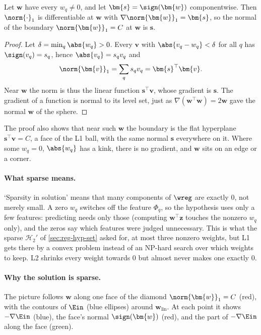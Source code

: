 \begin{lemma}\label{lem:l1-normal}
    Let \(\bm{w}\) have every \(w_q \neq 0\), and let \(\bm{s} =
    \sign(\bm{w})\) componentwise. Then \(\norm{\cdot}_1\) is differentiable
    at \(\bm{w}\) with \(\nabla \norm{\bm{w}}_1 = \bm{s}\), so the normal of the
    boundary \(\norm{\bm{w}}_1 = C\) at \(\bm{w}\) is \(\bm{s}\).
\end{lemma}

\begin{proof}
    Let \(\delta = \min_q \abs{w_q} > 0\). Every \(\bm{v}\) with \(\abs{v_q -
    w_q} < \delta\) for all \(q\) has \(\sign(v_q) = s_q\), hence
    \(\abs{v_q} = s_q v_q\) and
    \[
        \norm{\bm{v}}_1 = \sum_q s_q v_q = \bm{s}^\top \bm{v} .
    \]
    Near \(\bm{w}\) the norm is thus the linear function \(\bm{s}^\top
    \bm{v}\), whose gradient is \(\bm{s}\). The gradient of a function is
    normal to its level set, just as \(\nabla(\bm{w}^\top \bm{w}) = 2\bm{w}\)
    gave the normal \(\bm{w}\) of the sphere.
\end{proof}

The proof also shows that near such \(\bm{w}\) the boundary is the flat
hyperplane \(\bm{s}^\top \bm{v} = C\), a face of the L1 ball, with the same
normal \(\bm{s}\) everywhere on it. Where some \(w_q = 0\), \(\abs{w_q}\) has a
kink, there is no gradient, and \(\bm{w}\) sits on an edge or a corner.

\paragraph{What sparse means.} `Sparsity in solution' means that many
components of \(\wreg\) are exactly \(0\), not merely small. A zero \(w_q\)
switches off the feature \(\Phi_q\), so the hypothesis uses only a few
features: predicting needs only those (computing \(\bm{w}^\top \bm{z}\) touches
the nonzero \(w_q\) only), and the zeros say which features were judged
unnecessary. This is what the sparse \(\mathcal{H}_2'\) of
\autoref{sec:reg-hyp-set} asked for, at most three nonzero weights, but L1
gets there by a convex problem instead of an NP-hard search over which weights
to keep. L2 shrinks every weight towards \(0\) but almost never makes one
exactly \(0\).

\paragraph{Why the solution is sparse.} The picture follows \(\bm{w}\) along one
face of the diamond \(\norm{\bm{w}}_1 = C\) (red), with the contours of
\(\Ein\) (blue ellipses) around \(\bm{w}_{\mathrm{lin}}\). At each point it
shows \(-\nabla \Ein\) (blue), the face's normal \(\sign(\bm{w})\) (red), and
the part of \(-\nabla \Ein\) along the face (green).

